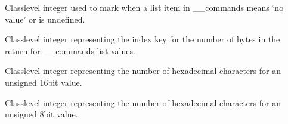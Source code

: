 \documentclass[letterpaper,10pt,english]{sphinxmanual}
\begin{document}
\begin{fulllineitems}
\begin{fulllineitems}
\label{\detokenize{PodCommands:PodCommands.POD_Commands.__NOVALUE}}
\pysigstartsignatures
{}
\pysigstopsignatures
\sphinxAtStartPar
Class\sphinxhyphen{}level integer used to mark when a list item in \_\_commands means ‘no value’     or is undefined.

\end{fulllineitems}


\begin{fulllineitems}
\label{\detokenize{PodCommands:PodCommands.POD_Commands.__RETURNS}}
\pysigstartsignatures
{}
\pysigstopsignatures
\sphinxAtStartPar
Class\sphinxhyphen{}level integer representing the index key for the number of bytes in the     return for \_\_commands list values.

\end{fulllineitems}


\begin{fulllineitems}
\label{\detokenize{PodCommands:PodCommands.POD_Commands.__U16}}
\pysigstartsignatures
{}
\pysigstopsignatures
\sphinxAtStartPar
Class\sphinxhyphen{}level integer representing the number of hexadecimal characters for an     unsigned 16\sphinxhyphen{}bit value.

\end{fulllineitems}


\begin{fulllineitems}
\label{\detokenize{PodCommands:PodCommands.POD_Commands.__U8}}
\pysigstartsignatures
{}
\pysigstopsignatures
\sphinxAtStartPar
Class\sphinxhyphen{}level integer representing the number of hexadecimal characters for an     unsigned 8\sphinxhyphen{}bit value.

\end{fulllineitems}


\end{fulllineitems}
\end{document}
